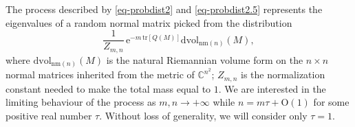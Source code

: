 \documentclass{birkart}
\theoremstyle{definition}
\theoremstyle{remark}
\numberwithin{equation}{section}
\numberwithin{figure}{section}
\newcommand{\e}{\mathrm e}
\newcommand{\1}{{\mathbf 1}}
\newcommand{\C}{{\mathbb C}}
\newcommand{\Ordo}{\mathrm{O}}
\newcommand{\diff}{{\mathrm d}}
\begin{document}
The process described by \eqref{eq-probdist2} and \eqref{eq-probdist2.5}
represents the eigenvalues of a random normal matrix picked from the 
distribution 
\begin{equation}
\frac{1}{Z_{m,n}}\,\e^{-m\,\mathrm{tr}[Q(M)]} 
\diff\mathrm{vol}_{\mathrm{nm}(n)}(M),
\label{eq-ginQ}
\end{equation}
where 
$\diff\mathrm{vol}_{\mathrm{nm}(n)}(M)$ is the natural Riemannian volume 
form on the $n\times n$ normal matrices inherited from the metric of 
$\C^{n^2}$; $Z_{m,n}$ is the normalization constant needed to make the total 
mass equal to $1$. We are interested in the limiting behaviour of the 
process as $m,n\to+\infty$ while $n=m\tau+\Ordo(1)$ for some positive real 
number $\tau$. Without loss of generality, we will consider only $\tau=1$. 
\medskip
\end{document}
